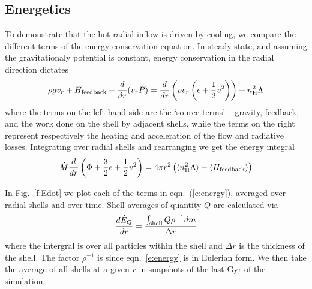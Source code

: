 \documentclass[fleqn,usenatbib]{mnras}
\newcommand{\Mdot}{\dot{M}}
\newcommand{\nH}{n_{\rm H}}
\begin{document}
\subsection{Energetics}

To demonstrate that the hot radial inflow is driven by cooling, we compare the different terms of the energy conservation equation. In steady-state, and assuming the gravitationaly potential is constant,  energy conservation in the radial direction dictates \citep[e.g.][]{Shu82}
\begin{equation}\label{e:energy}
    \rho g v_r + H_{\rm feedback} - \frac{d}{dr}(v_r P)= 
    \frac{d}{dr}\left(\rho v_r \left(\epsilon+\frac{1}{2}v^2\right)\right)  +  \nH^2\Lambda  
\end{equation}
where the terms on the left hand side are the `source terms' -- gravity, feedback, and the work done on the shell by adjacent shells, while the terms on the right represent respectively the heating and acceleration of the flow and radiative losses. 
Integrating over radial shells and rearranging we get the energy integral
\begin{equation}
    \Mdot\frac{d}{dr}\left(\Phi+\frac{3}{2}\epsilon + \frac{1}{2}v^2\right) = 4\pi r^2 \left(\langle\nH^2\Lambda\rangle-\langle H_{\rm feedback}\rangle\right)
\end{equation}

In Fig.~\ref{f:Edot} we plot each of the terms in eqn.~(\ref{e:energy}), averaged over radial shells and over time. Shell averages of quantity $Q$ are calculated via 
\begin{equation}
    \frac{d\dot{E}_Q}{d r} = \frac{\int_{\rm shell} Q\rho^{-1} dm}{\Delta r} 
\end{equation}
where the intergral is over all particles within the shell and $\Delta r$ is the thickness of the shell. The factor $\rho^{-1}$ is since eqn.~\ref{e:energy} is in Eulerian form. We then take the average of all shells at a given $r$ in snapshots of the last Gyr of the simulation. 
\end{document}
